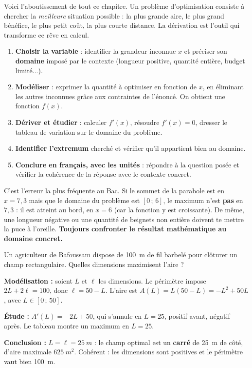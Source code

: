 \documentclass[11pt]{article}
\newcommand{\cle}[1]{{\popxbold\color{popdark}#1}}
\newcounter{popsec}
\newcounter{popsub}
\newcommand{\courssub}[1]{%
  \stepcounter{popsub}%
  \par\vspace{9pt}\noindent{\popxbold\fontsize{11.5}{13}\selectfont\color{popink}{\color{poporange}\thepopsec.\thepopsub}\hspace{6pt}#1}\par\nopagebreak\vspace{4pt}
}
\begin{document}
\courssub{Problèmes d'optimisation}

Voici l'aboutissement de tout ce chapitre. Un \cle{problème d'optimisation} consiste à chercher la \emph{meilleure} situation possible : la plus grande aire, le plus grand bénéfice, le plus petit coût, la plus courte distance. La dérivation est l'outil qui transforme ce rêve en calcul.

\begin{methode}
\begin{enumerate}
\item \textbf{Choisir la variable} : identifier la grandeur inconnue $x$ et préciser son \textbf{domaine} imposé par le contexte (longueur positive, quantité entière, budget limité...).
\item \textbf{Modéliser} : exprimer la quantité à optimiser en fonction de $x$, en éliminant les autres inconnues grâce aux contraintes de l'énoncé. On obtient une fonction $f(x)$.
\item \textbf{Dériver et étudier} : calculer $f'(x)$, résoudre $f'(x) = 0$, dresser le tableau de variation sur le domaine du problème.
\item \textbf{Identifier l'extremum} cherché et vérifier qu'il appartient bien au domaine.
\item \textbf{Conclure en français, avec les unités} : répondre à la question posée et vérifier la cohérence de la réponse avec le contexte concret.
\end{enumerate}
\end{methode}

\begin{attention}
C'est l'erreur la plus fréquente au Bac. Si le sommet de la parabole est en $x = 7{,}3$ mais que le domaine du problème est $[0\,;\,6]$, le maximum n'est \textbf{pas} en $7{,}3$ : il est atteint au bord, en $x = 6$ (car la fonction y est croissante). De même, une longueur négative ou une quantité de beignets non entière doivent te mettre la puce à l'oreille. \textbf{Toujours confronter le résultat mathématique au domaine concret.}
\end{attention}

\begin{exemplebox}
Un agriculteur de Bafoussam dispose de \SI{100}{m} de fil barbelé pour clôturer un champ rectangulaire. Quelles dimensions maximisent l'aire ?

\textbf{Modélisation :} soient $L$ et $\ell$ les dimensions. Le périmètre impose $2L + 2\ell = 100$, donc $\ell = 50 - L$. L'aire est $A(L) = L(50 - L) = -L^2 + 50L$, avec $L \in [0\,;\,50]$.

\textbf{Étude :} $A'(L) = -2L + 50$, qui s'annule en $L = 25$, positif avant, négatif après. Le tableau montre un maximum en $L = 25$.

\textbf{Conclusion :} $L = \ell = \SI{25}{m}$ : le champ optimal est un \textbf{carré} de \SI{25}{m} de côté, d'aire maximale $\SI{625}{m^2}$. Cohérent : les dimensions sont positives et le périmètre vaut bien \SI{100}{m}.
\end{exemplebox}
\end{document}
